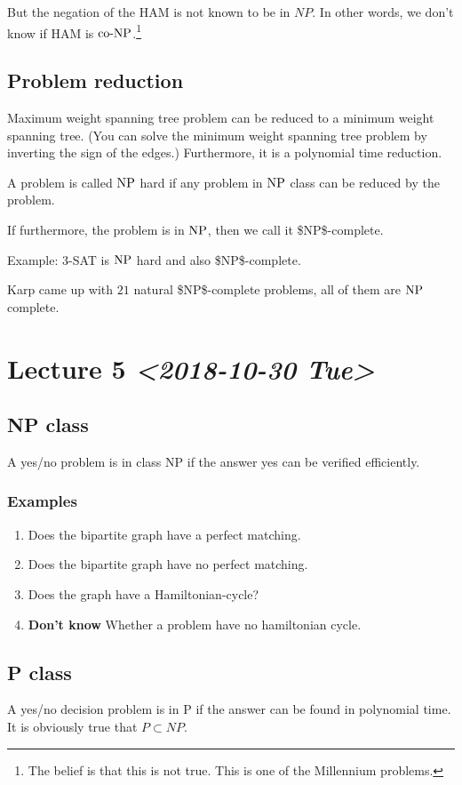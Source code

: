 \documentclass[11pt]{article}
\def\NP{\textup{NP}}
\def\coNP{\textup{co-NP}}
\begin{document}
But the negation of the HAM is not known to be in \(NP\). In other words, we
don't know if HAM is \(\coNP\).\footnote{The belief is that this is not true. This is one of the Millennium problems.}
\subsection{Problem reduction}
\label{sec:org95184e7}
Maximum weight spanning tree problem can be reduced to a minimum weight
spanning tree. (You can solve the minimum weight spanning tree problem by
inverting the sign of the edges.) Furthermore, it is a polynomial time
reduction.

A problem is called \(\NP\) hard if any problem in \(\NP\) class can be reduced
by the problem.

If furthermore, the problem is in \(\NP\), then we call it \$\NP\$-complete.

Example: 3-SAT is \(\NP\) hard and also \$\NP\$-complete. 

Karp came up with \(21\) natural \$\NP\$-complete problems, all of them are \(\NP\)
complete.
\section{Lecture 5 \textit{<2018-10-30 Tue>}}
\label{sec:org6e40511}
\subsection{NP class}
\label{sec:orgbec12bd}
A yes/no problem is in class NP if the answer yes can be verified
efficiently.
\subsubsection{Examples}
\label{sec:org7389231}
\begin{enumerate}
\item Does the bipartite graph have a perfect matching.
\item Does the bipartite graph have no perfect matching.
\item Does the graph have a Hamiltonian-cycle?
\item \textbf{Don't know} Whether a problem have no hamiltonian cycle.
\end{enumerate}
\subsection{P class}
\label{sec:org59552c4}
A yes/no decision problem is in P if the answer can be found in polynomial
time. It is obviously true that \(P \subset NP\).
\end{document}
